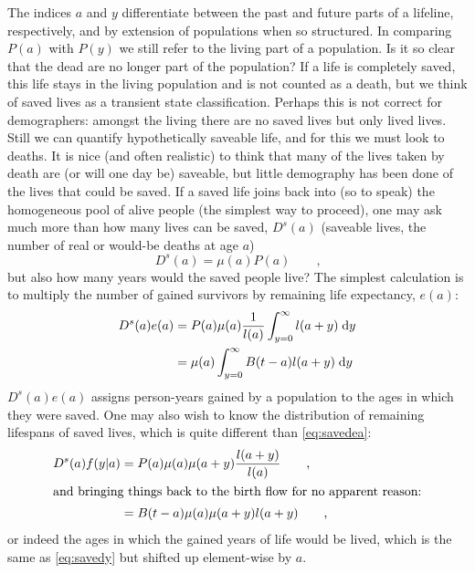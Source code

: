 \documentclass{article}
\newcommand{\dd}{\; \mathrm{d}}
\newcommand{\tc}{\quad\quad\text{,}}
\begin{document}
The indices $a$ and $y$ differentiate between the past and future
parts of a lifeline, respectively, and by extension of populations when
so structured.
In comparing $P(a)$ with $P(y)$ we still refer to the living part of a population.
Is it so clear that the dead are no longer part of the population? If a life is
completely saved, this life stays in the living population and is not counted
as a death, but we think of saved lives as a transient state classification.
Perhaps this is not correct for demographers: amongst the living there
are no saved lives but only lived lives. Still we can quantify
hypothetically saveable life, and for this we must look to deaths.
It is nice (and often realistic) to think that many of the lives taken by death are (or will one day be) saveable, but little demography has been done of the lives that could be saved. If a saved life joins back into (so to speak) the homogeneous pool of alive people (the simplest way
to proceed), one may ask much more than how many lives can be saved, $D^s(a)$
(saveable lives, the number of real or would-be deaths at age $a$)
\begin{equation}
D^s(a) = \mu(a)P(a) \quad \quad \text{,}
\end{equation}
but also how many years would the saved people live? The simplest calculation is
to multiply the number of gained survivors by remaining life expectancy, $e(a)$:
\begin{align}
\label{eq:savedea}
D^s(a)e(a) &= P(a)\mu(a)\frac{1}{l(a)}\int_{y=0}^\infty l(a+y) \dd y \notag\\
         &= \mu(a)\int_{y=0}^\infty B(t-a)l(a+y) \dd y 
\end{align}
$D^s(a)e(a)$ assigns person-years gained by a population to the ages in which
they were saved. One may also wish
to know the distribution of remaining lifespans of saved lives, which is quite different than \eqref{eq:savedea}:
\begin{align}
\label{eq:savedy}
D^s(a)f(y|a) &= P(a)\mu(a)\mu(a+y) \frac{l(a+y)}{l(a)} \notag \tc\\
\intertext{and bringing things back to the birth flow for no apparent reason:}
           &= B(t-a)\mu(a)\mu(a+y)l(a+y) \tc
\end{align}
or indeed the ages in which the gained years of life would be lived, which is
the same as \eqref{eq:savedy} but shifted up element-wise by $a$. 
\end{document}
